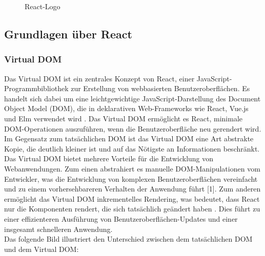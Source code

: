 \begin{figure}[htbp]
	\centering
	\caption{React-Logo}
\end{figure}
\newpage
\subsection{Grundlagen über React}
\subsubsection{Virtual DOM}
Das Virtual DOM ist ein zentrales Konzept von React, einer JavaScript-Programmbibliothek zur Erstellung von webbasierten Benutzeroberflächen\cite{ReactWikipedia}. Es handelt sich dabei um eine leichtgewichtige JavaScript-Darstellung des Document Object Model (DOM), die in deklarativen Web-Frameworks wie React, Vue.js und Elm verwendet wird \cite{VueJsAdesso}. Das Virtual DOM ermöglicht es React, minimale DOM-Operationen auszuführen, wenn die Benutzeroberfläche neu gerendert wird. Im Gegensatz zum tatsächlichen DOM ist das Virtual DOM eine Art abstrakte Kopie, die deutlich kleiner ist und auf das Nötigste an Informationen beschränkt.\cite{ReactWikipedia}\\
Das Virtual DOM bietet mehrere Vorteile für die Entwicklung von Webanwendungen. Zum einen abstrahiert es manuelle DOM-Manipulationen vom Entwickler, was die Entwicklung von komplexen Benutzeroberflächen vereinfacht und zu einem vorhersehbareren Verhalten der Anwendung führt [1]. Zum anderen ermöglicht das Virtual DOM inkrementelles Rendering, was bedeutet, dass React nur die Komponenten rendert, die sich tatsächlich geändert haben \cite{ReactWikipedia}. Dies führt zu einer effizienteren Ausführung von Benutzeroberflächen-Updates und einer insgesamt schnelleren Anwendung.\\
Das folgende Bild illustriert den Unterschied zwischen dem tatsächlichen DOM und dem Virtual DOM:


